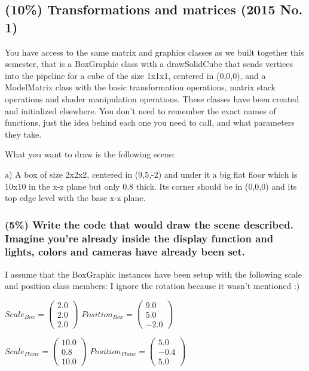 \subsection{(10\%) Transformations and matrices (2015 No. 1)}
You have access to  the same matrix and graphics classes as we built together this semester, that is a BoxGraphic class with a drawSolidCube that sends vertices into the pipeline for a cube of the size 1x1x1, centered in (0,0,0), and a ModelMatrix class with the basic transformation operations, matrix stack operations and shader manipulation operations. These classes have been created and initialized elsewhere.  You don’t need to remember the exact names of functions, just the idea behind each one you need to call, and what parameters they take. 

What you want to draw is the following scene: 

a) A box of size 2x2x2, centered in (9,5,-2) and under it a big flat floor which is 10x10 in the x-z plane but only 0.8 thick.  Its corner should be in (0,0,0) and its top edge level with the base x-z plane.

\subsubsection{(5\%) Write the code that would draw the scene described.  Imagine you’re already inside the display function and lights, colors and cameras have already been set.}

I assume that the BoxGraphic instances have been setup with the following scale and position class members: I ignore the rotation because it wasn't mentioned :)

$ Scale_{Box} = \left(\begin{array}{c}2.0\\2.0\\2.0\end{array}\right)$
$ Position_{Box} = \left(\begin{array}{c}9.0\\5.0\\-2.0\end{array}\right)$

$ Scale_{Plane} = \left(\begin{array}{c}10.0\\0.8\\10.0\end{array}\right)$
$ Position_{Plane} = \left(\begin{array}{c}5.0\\-0.4\\5.0\end{array}\right)$

